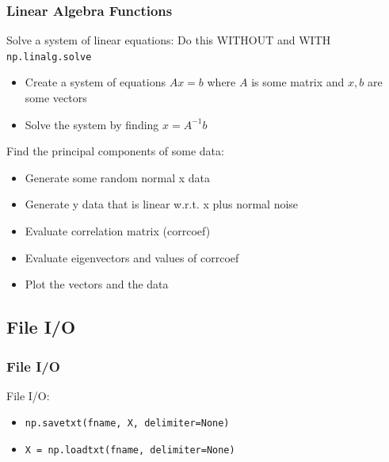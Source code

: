 \documentclass{beamer}
\newcommand{\code}[1]{\texttt{#1}}
\begin{document}
\begin{frame}	
	\frametitle{Linear Algebra Functions}
	
	\begin{exampleblock}{Solve a system of linear equations:}
		\footnotesize
		Do this WITHOUT and WITH \code{np.linalg.solve}
		\begin{itemize}
			\footnotesize
			\item Create a system of equations $Ax = b$ where $A$ is some matrix and $x,b$ are some vectors
			\item Solve the system by finding $x = A^{-1}b$
		\end{itemize}
	\end{exampleblock}
	
	\begin{exampleblock}{Find the principal components of some data:}
		\footnotesize
		\begin{itemize}
			\footnotesize
			\item Generate some random normal x data
			\item Generate y data that is linear w.r.t. x plus normal noise
			\item Evaluate correlation matrix (corrcoef)
			\item Evaluate eigenvectors and values of corrcoef
			\item Plot the vectors and the data
		\end{itemize}
	\end{exampleblock}
	
\end{frame}


\subsection{File I/O}

\begin{frame}	
	\frametitle{File I/O}
	
	\begin{block}{File I/O:}
		\begin{itemize}
			\item \code{np.savetxt(fname, X, delimiter=None)}
			\item \code{X = np.loadtxt(fname, delimiter=None)}
		\end{itemize}
	\end{block}
	
\end{frame}


\end{document}
